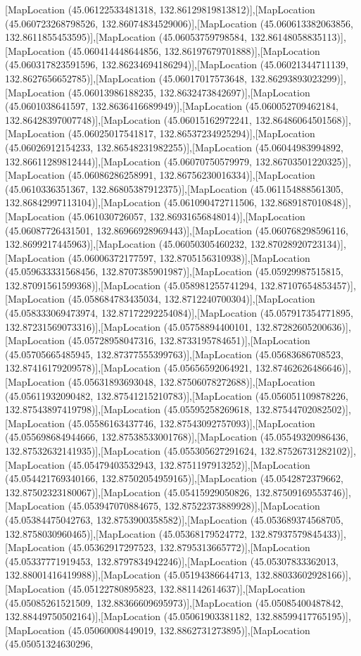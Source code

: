 [MapLocation (45.06122533481318, 132.86129819813812)],[MapLocation (45.060723268798526, 132.86074834529006)],[MapLocation (45.060613382063856, 132.8611855453595)],[MapLocation (45.06053759798584, 132.86148058835113)],[MapLocation (45.060414448644856, 132.86197679701888)],[MapLocation (45.060317823591596, 132.86234694186294)],[MapLocation (45.06021344711139, 132.8627656652785)],[MapLocation (45.06017017573648, 132.86293893023299)],[MapLocation (45.06013986188235, 132.8632473842697)],[MapLocation (45.0601038641597, 132.8636416689949)],[MapLocation (45.060052709462184, 132.86428397007748)],[MapLocation (45.06015162972241, 132.86486064501568)],[MapLocation (45.06025017541817, 132.86537234925294)],[MapLocation (45.06026912154233, 132.86548231982255)],[MapLocation (45.06044983994892, 132.86611289812444)],[MapLocation (45.06070750579979, 132.86703501220325)],[MapLocation (45.06086286258991, 132.86756230016334)],[MapLocation (45.0610336351367, 132.86805387912375)],[MapLocation (45.061154888561305, 132.86842997113104)],[MapLocation (45.061090472711506, 132.8689187010848)],[MapLocation (45.061030726057, 132.86931656848014)],[MapLocation (45.06087726431501, 132.86966928969443)],[MapLocation (45.060768298596116, 132.8699217445963)],[MapLocation (45.06050305460232, 132.87028920723134)],[MapLocation (45.06006372177597, 132.8705156310938)],[MapLocation (45.059633331568456, 132.8707385901987)],[MapLocation (45.05929987515815, 132.87091561599368)],[MapLocation (45.058981255741294, 132.87107654853457)],[MapLocation (45.058684783435034, 132.8712240700304)],[MapLocation (45.058333069473974, 132.87172292254084)],[MapLocation (45.057917354771895, 132.87231569073316)],[MapLocation (45.05758894400101, 132.87282605200636)],[MapLocation (45.05728958047316, 132.8733195784651)],[MapLocation (45.05705665485945, 132.87377555399763)],[MapLocation (45.05683686708523, 132.87416179209578)],[MapLocation (45.05656592064921, 132.87462626486646)],[MapLocation (45.05631893693048, 132.87506078272688)],[MapLocation (45.05611932090482, 132.87541215210783)],[MapLocation (45.056051109878226, 132.87543897419798)],[MapLocation (45.05595258269618, 132.87544702082502)],[MapLocation (45.05586163437746, 132.87543092757093)],[MapLocation (45.055698684944666, 132.87538533001768)],[MapLocation (45.05549320986436, 132.87532632141935)],[MapLocation (45.055305627291624, 132.87526731282102)],[MapLocation (45.05479403532943, 132.8751197913252)],[MapLocation (45.054421769340166, 132.87502054959165)],[MapLocation (45.0542872379662, 132.87502323180067)],[MapLocation (45.05415929050826, 132.87509169553746)],[MapLocation (45.053947070884675, 132.87522373889928)],[MapLocation (45.05384475042763, 132.8753900358582)],[MapLocation (45.053689374568705, 132.8758030960465)],[MapLocation (45.05368179524772, 132.87937579845433)],[MapLocation (45.05362917297523, 132.8795313665772)],[MapLocation (45.05337771919453, 132.8797834942246)],[MapLocation (45.05307833362013, 132.88001416419988)],[MapLocation (45.05194386644713, 132.88033602928166)],[MapLocation (45.05122780895823, 132.881142614637)],[MapLocation (45.05085261521509, 132.88366609695973)],[MapLocation (45.05085400487842, 132.88449750502164)],[MapLocation (45.05061903381182, 132.88599417765195)],[MapLocation (45.05060008449019, 132.8862731273895)],[MapLocation (45.05051324630296, 